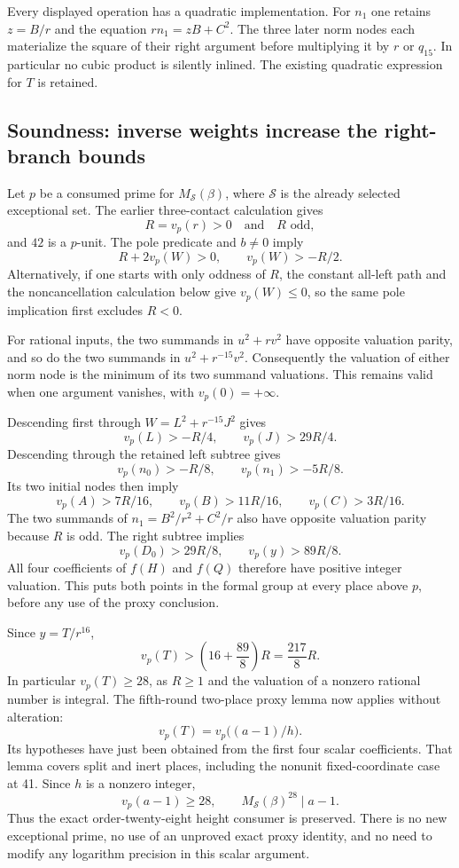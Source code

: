 Every displayed operation has a quadratic implementation. For $n_1$
one retains $z=B/r$ and the equation $rn_1=zB+C^2$. The three later
norm nodes each materialize the square of their right argument before
multiplying it by $r$ or $q_{15}$. In particular no cubic product is
silently inlined. The existing quadratic expression for $T$ is retained.

\subsection{Soundness: inverse weights increase the right-branch bounds}

Let $p$ be a consumed prime for $M_{\mathcal S}(\beta)$, where
$\mathcal S$ is the already selected exceptional set. The earlier
three-contact calculation gives
\[
 R=v_p(r)>0\quad\text{and}\quad R\text{ odd},
\]
and $42$ is a $p$-unit. The pole predicate and $b\ne0$ imply
\[
 R+2v_p(W)>0,\qquad v_p(W)>-R/2.
\]
Alternatively, if one starts with only oddness of $R$, the constant
all-left path and the noncancellation calculation below give $v_p(W)\le0$,
so the same pole implication first excludes $R<0$.

For rational inputs, the two summands in
$u^2+r v^2$ have opposite valuation parity, and so do the two summands
in $u^2+r^{-15}v^2$. Consequently the valuation of either norm node is
the minimum of its two summand valuations. This remains valid when one
argument vanishes, with $v_p(0)=+\infty$.

Descending first through $W=L^2+r^{-15}J^2$ gives
\[
 v_p(L)>-R/4,\qquad v_p(J)>29R/4.
\]
Descending through the retained left subtree gives
\[
 v_p(n_0)>-R/8,\qquad v_p(n_1)>-5R/8.
\]
Its two initial nodes then imply
\[
 v_p(A)>7R/16,\qquad
 v_p(B)>11R/16,\qquad
 v_p(C)>3R/16.
\]
The two summands of $n_1=B^2/r^2+C^2/r$ also have opposite valuation
parity because $R$ is odd. The right subtree implies
\[
 v_p(D_0)>29R/8,\qquad v_p(y)>89R/8.
\]
All four coefficients of $f(H)$ and $f(Q)$ therefore have positive
integer valuation. This puts both points in the formal group at every
place above $p$, before any use of the proxy conclusion.

Since $y=T/r^{16}$,
\[
 v_p(T)>\left(16+\frac{89}{8}\right)R=\frac{217}{8}R.
\]
In particular $v_p(T)\ge28$, as $R\ge1$ and the valuation of a
nonzero rational number is integral. The fifth-round two-place proxy
lemma now applies without alteration:
\[
 v_p(T)=v_p\bigl((a-1)/h\bigr).
\]
Its hypotheses have just been obtained from the first four scalar
coefficients. That lemma covers split and inert places, including the
nonunit fixed-coordinate case at 41. Since $h$ is a nonzero integer,
\[
 v_p(a-1)\ge28,
 \qquad M_{\mathcal S}(\beta)^{28}\mid a-1.
\]
Thus the exact order-twenty-eight height consumer is preserved. There
is no new exceptional prime, no use of an unproved exact proxy identity,
and no need to modify any logarithm precision in this scalar argument.

